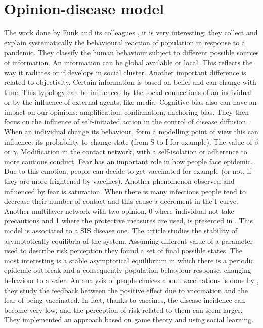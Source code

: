 \section{Opinion-disease model}
The work done by Funk and its colleagues \cite{ Funk_2010}, it is very interesting: they collect and explain systematically the behavioural reaction of population in response to a pandemic. They classify the human behaviour subject to different possible sources of information. An information can be global available or local. This reflects the way it radiates or if develops in social cluster. Another important difference is related to objectivity. Certain information is based on belief and can change with time. This typology can be influenced by the social connections of an individual or by the influence of external agents, like media. Cognitive bias also can have an impact on our opinions: amplification, confirmation, anchoring bias. They then focus on the influence of self-initiated action in the control of disease diffusion. When an individual change its behaviour, form a modelling point of view this can influence: its probability to change state (from S to I for example). The value of $\beta$ or $\gamma$. Modification in the contact network, with a self-isolation or adherence to more cautious conduct. Fear has an important role in how people face epidemic. Due to this emotion, people can decide to get vaccinated for example (or not, if they are more frightened by vaccines). Another phenomenon observed and influenced by fear is saturation. When there is many infectious people tend to decrease their number of contact and this cause a decrement in the I curve.  Another multilayer network with two opinion, 0 where individual not take precautions and 1 where the protective measures are used, is presented in \cite{Frieswijk_2022}. This model is associated to a SIS disease one. The article studies the stability of asymptotically equilibria of the system. Assuming different value of a parameter used to describe risk perception they found a set of final possible states. The most interesting is a stable asymptotical equilibrium in which there is a periodic epidemic outbreak and a consequently population behaviour response, changing behaviour to a safer.
An analysis of people choices about vaccinations is done by \cite{Bauch_2012_game}, they study the feedback between the positive effect due to vaccination and the fear of being vaccinated. In fact, thanks to vaccines, the disease incidence can become very low, and the perception of risk related to them can seem larger. They implemented an approach based on game theory and using social learning.
